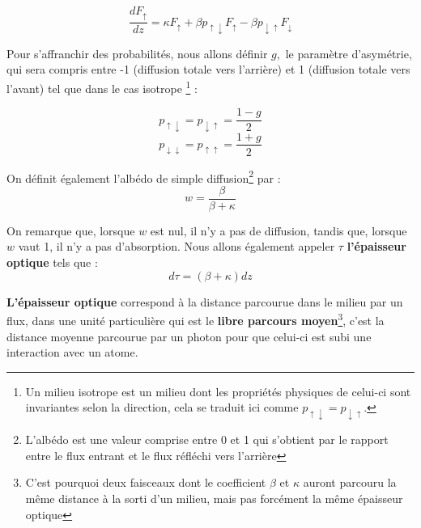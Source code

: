 \documentclass[12pt]{article}
\begin{document}
\begin{equation}
    \frac{dF_{\uparrow}}{dz}=\kappa F_{\uparrow}+\beta p_{{\uparrow}{\downarrow}}F_{\uparrow} - \beta p_{{\downarrow}{\uparrow}}F_{\downarrow}
    \label{eq:fluxhaut}
\end{equation} \par
Pour s'affranchir des probabilités, nous allons définir $g,$ le paramètre d'asymétrie, qui sera compris entre -1 (diffusion totale vers l'arrière) et 1 (diffusion totale vers l'avant) tel que dans le cas isotrope \footnote{Un milieu isotrope est un milieu dont les propriétés physiques de celui-ci sont invariantes selon la direction, cela se traduit ici comme $p_{{\uparrow}{\downarrow}}=p_{{\downarrow}{\uparrow}}$.} :

\begin{equation}
    p_{{\uparrow}{\downarrow}}=p_{{\downarrow}{\uparrow}}=\frac{1-g}{2} 
    \label{eq:p}
\end{equation}
\begin{equation}
    p_{{\downarrow}{\downarrow}}=p_{{\uparrow}{\uparrow}}=\frac{1+g}{2}
\end{equation}\par
On définit également l'albédo de simple diffusion\footnote{L'albédo est une valeur comprise entre 0 et 1 qui s'obtient par le rapport entre le flux entrant et le flux réfléchi vers l'arrière%
}
par :
\begin{equation}
    w=\frac{\beta}{\beta+\kappa}
    \label{eq:w}
\end{equation} \par

On remarque que, lorsque $w$ est nul, il n'y a pas de diffusion, tandis que, lorsque $w$ vaut 1, il n'y a pas d'absorption. Nous allons également appeler ${\tau}$ \textbf{l'épaisseur optique} tels que :
\begin{equation}
    d\tau=(\beta+\kappa)dz
    \label{eq:tau}
\end{equation}\par
\textbf{L'épaisseur optique} correspond à la distance parcourue dans le milieu par un flux, dans une unité particulière qui est le \textbf{libre parcours moyen}\footnote{C'est pourquoi deux faisceaux dont le coefficient $\beta$ et $\kappa$ auront parcouru la même distance à la sorti d'un milieu, mais pas forcément la même épaisseur optique}, c'est la distance moyenne parcourue par un photon pour que celui-ci est subi une interaction avec un atome.
\end{document}
